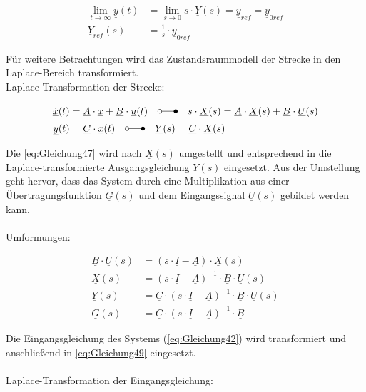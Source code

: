 \begin{align}
    \lim_{t \to \infty} \underline{y}(t) &= \lim_{s \to 0} s\cdot\underline{Y}(s) = \underline{y}_{ref} = \underline{y}_{0ref} \label{eq:Gleichung45}\\
    \underline{Y}_{ref}(s) &= \frac{1}{s}\cdot\underline{y}_{0ref} \label{eq:Gleichung46}
\end{align}

Für weitere Betrachtungen wird das Zustandsraummodell der Strecke in den Laplace-Bereich transformiert.\\
Laplace-Transformation der Strecke:

\begin{align}
    \underline{\dot{x}}(t) &= \underline{A}\cdot\underline{x}+\underline{B}\cdot\underline{u}(t)\quad\laplace\quad s\cdot \underline{X}(s) = \underline{A}\cdot\underline{X}(s)+\underline{B}\cdot\underline{U}(s) \label{eq:Gleichung47}\\
    \underline{y}(t) &= \underline{C}\cdot\underline{x}(t) \quad\laplace\quad \underline{Y}(s) = \underline{C}\cdot\underline{X}(s) \label{eq:Gleichung48}
\end{align}

Die \autoref{eq:Gleichung47} wird nach $\underline{X}(s)$ umgestellt und entsprechend in die Laplace-transformierte Ausgangsgleichung $\underline{Y}(s)$ eingesetzt. Aus der Umstellung geht hervor, dass das System durch eine Multiplikation aus einer Übertragungsfunktion $\underline{G}(s)$ und dem Eingangssignal $\underline{U}(s)$ gebildet werden kann.\\\\
Umformungen:

\begin{align}
    \underline{B}\cdot\underline{U}(s) &= (s\cdot\underline{I}-\underline{A})\cdot\underline{X}(s) \label{eq:Gleichung49}\\
    \underline{X}(s) &= (s\cdot\underline{I}-\underline{A})^{-1}\cdot\underline{B}\cdot\underline{U}(s) \nonumber \\
    \underline{Y}(s) &= \underline{C}\cdot(s\cdot\underline{I}-\underline{A})^{-1}\cdot\underline{B}\cdot\underline{U}(s) \label{eq:Gleichung50}\\
    \underline{G}(s) &= \underline{C}\cdot(s\cdot\underline{I}-\underline{A})^{-1}\cdot\underline{B} \nonumber
\end{align}

Die Eingangsgleichung des Systems (\autoref{eq:Gleichung42}) wird transformiert und anschließend in \autoref{eq:Gleichung49} eingesetzt.\\\\
Laplace-Transformation der Eingangsgleichung:

